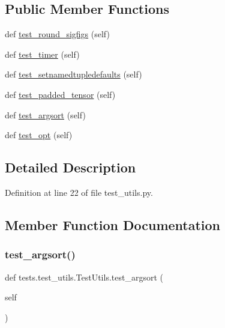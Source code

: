 \subsection*{Public Member Functions}
\begin{DoxyCompactItemize}
\item 
def \hyperlink{classtests_1_1test__utils_1_1TestUtils_aa020fc67900c834a020730f29cacc916}{test\+\_\+round\+\_\+sigfigs} (self)
\item 
def \hyperlink{classtests_1_1test__utils_1_1TestUtils_aa4b5f19e38d6da7a8947226c60007184}{test\+\_\+timer} (self)
\item 
def \hyperlink{classtests_1_1test__utils_1_1TestUtils_a211bff449c261cce734e51e3a937d1af}{test\+\_\+setnamedtupledefaults} (self)
\item 
def \hyperlink{classtests_1_1test__utils_1_1TestUtils_a9d3d0280ce67a3e6b039b9184844dc45}{test\+\_\+padded\+\_\+tensor} (self)
\item 
def \hyperlink{classtests_1_1test__utils_1_1TestUtils_ad9ee6ef6b6ce7d9f168234eddf5d3716}{test\+\_\+argsort} (self)
\item 
def \hyperlink{classtests_1_1test__utils_1_1TestUtils_a595e1217b715af6a4670ee244c9aa61f}{test\+\_\+opt} (self)
\end{DoxyCompactItemize}


\subsection{Detailed Description}


Definition at line 22 of file test\+\_\+utils.\+py.



\subsection{Member Function Documentation}
\mbox{\label{classtests_1_1test__utils_1_1TestUtils_ad9ee6ef6b6ce7d9f168234eddf5d3716}} 
\subsubsection{\texorpdfstring{test\+\_\+argsort()}{test\_argsort()}}
{\footnotesize\ttfamily def tests.\+test\+\_\+utils.\+Test\+Utils.\+test\+\_\+argsort (\begin{DoxyParamCaption}\item[{}]{self }\end{DoxyParamCaption})}



